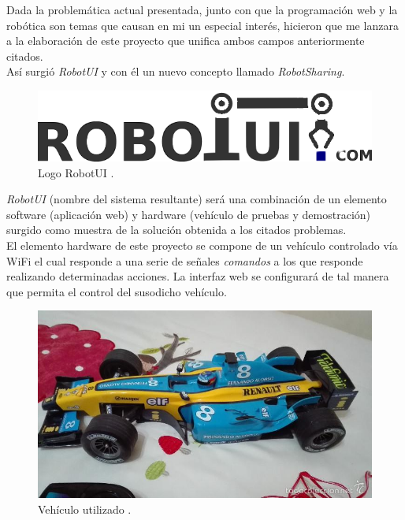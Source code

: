 Dada la problemática actual presentada, junto con que la programación web y la robótica son temas que causan en mi un especial interés, hicieron que me lanzara a la elaboración de este proyecto que unifica ambos campos anteriormente citados.\\

Así surgió \emph{RobotUI} y con él un nuevo concepto llamado \textit{RobotSharing}.\\

\begin{figure}[H]
  \begin{center}
    \includegraphics[scale=0.3]{imagenes/logotipo.png}
  \end{center}
  \label{fig:logo}
 \caption{Logo RobotUI \protect\footnotemark.}
\end{figure}


\emph{RobotUI} (nombre del sistema resultante) será una combinación de un elemento software (aplicación web) y hardware (vehículo de pruebas y demostración) surgido como muestra de la solución obtenida a los citados problemas.\\


El elemento hardware de este proyecto se compone de un vehículo controlado vía WiFi el cual responde a una serie de señales \emph{comandos} a los que responde realizando determinadas acciones.
La interfaz web se configurará de tal manera que permita el control del susodicho vehículo.\\

\begin{figure}[H]
  \begin{center}
    \includegraphics[scale=0.3]{imagenes/f1.jpg}
  \end{center}
  \label{fig:logo}
 \caption{Vehículo utilizado \protect\footnotemark.}
\end{figure}

